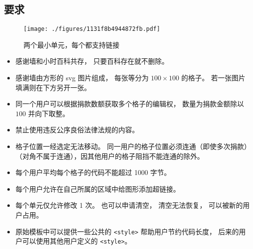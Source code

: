 
\subsection{要求}

\begin{figure}[ht]
\centering
\texttt{[image: ./figures/1131f8b4944872fb.pdf]}
\caption{两个最小单元，每个都支持链接} \label{fig_thanks_1}
\end{figure}

\begin{itemize}
\item 感谢墙和小时百科共存， 只要百科存在就不删除。
\item 感谢墙由方形的 svg 图片组成， 每张等分为 $100\times 100$ 的格子。 若一张图片填满则在下方另开一张。
\item 同一个用户可以根据捐款数额获取多个格子的编辑权， 数量为捐款金额除以 $100$ 并向下取整。
\item 禁止使用违反公序良俗法律法规的内容。
\item 格子位置一经选定无法移动。 同一用户的格子位置必须连通（即使多次捐款）（对角不属于连通），因其他用户的格子阻挡不能连通的除外。
\item 每个用户平均每个格子的代码不能超过 1000 字节。
\item 每个用户允许在自己所属的区域中给图形添加超链接。
\item 每个单元仅允许修改 1 次。 也可以申请清空， 清空无法恢复， 可以被新的用户占用。
\item 原始模板中可以提供一些公共的 \verb`<style>` 帮助用户节约代码长度， 后来的用户可以使用其他用户定义的 \verb`<style>`。
\end{itemize}

